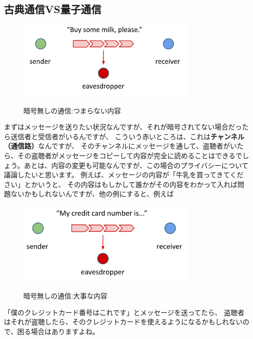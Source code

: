 \subsection{古典通信VS量子通信}
\begin{figure}[H]
    \centering
    \includegraphics[width=0.8\textwidth]{lesson1/milkplease.pdf}
    \label{fig: 1}
    \begin{center}
        \caption{暗号無しの通信:つまらない内容}
    \end{center}
\end{figure}
まずはメッセージを送りたい状況なんですが、それが暗号されてない場合だったら送信者と受信者がいるんですが、
こういう赤いところは、これは\textbf{チャンネル（通信路）}なんですが、
そのチャンネルにメッセージを通して、盗聴者がいたら、その盗聴者がメッセージをコピーして内容が完全に読めることはできるでしょう。あとは、内容の変更も可能なんですが、この場合のプライバシーについて議論したいと思います。
例えば、メッセージの内容が「牛乳を買ってきてください」とかいうと、
その内容はもしかして誰かがその内容をわかって入れば問題ないかもしれないんですが、他の例にすると、例えば
\begin{figure}[H]
    \centering
    \includegraphics[width=0.8\textwidth]{lesson1/creditcardinfo.pdf}
    \label{fig: 1}
    \begin{center}
        \caption{暗号無しの通信:大事な内容}
    \end{center}
\end{figure}
「僕のクレジットカード番号はこれです」とメッセージを送ってたら、
盗聴者はそれが盗聴したら、そのクレジットカードを使えるようになるかもしれないので、困る場合はありますよね。

